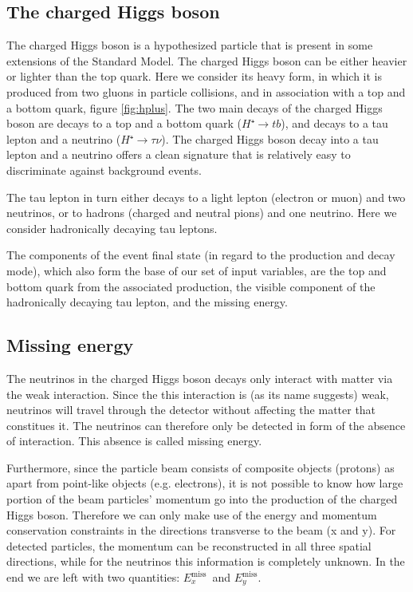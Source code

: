 \documentclass{scrartcl}
\newcommand{\exmiss}{$E_x^\text{miss}$}
\newcommand{\eymiss}{$E_y^\text{miss}$}
\begin{document}
\subsection{The charged Higgs boson}
The charged Higgs boson is a hypothesized particle that is present in some extensions of the Standard Model. The charged Higgs boson can be either heavier or lighter than the top quark. Here we consider its heavy form, in which it is produced from two gluons in particle collisions, and in association with a top and a bottom quark, figure \ref{fig:hplus}. The two main decays of the charged Higgs boson are decays to a top and a bottom quark ($H⁺→tb$), and decays to a tau lepton and a neutrino ($H⁺→τν$). The charged Higgs boson decay into a tau lepton and a neutrino offers a clean signature that is relatively easy to discriminate against background events.

The tau lepton in turn either decays to a light lepton (electron or muon) and two neutrinos, or to hadrons (charged and neutral pions) and one neutrino. Here we consider hadronically decaying tau leptons.

The components of the event final state (in regard to the production and decay mode), which also form the base of our set of input variables, are the top and bottom quark from the associated production, the visible component of the hadronically decaying tau lepton, and the missing energy.

\subsection{Missing energy}
The neutrinos in the charged Higgs boson decays only interact with matter via the weak interaction. Since the this interaction is (as its name suggests) weak, neutrinos will travel through the detector without affecting the matter that constitues it. The neutrinos can therefore only be detected in form of the absence of interaction. This absence is called missing energy.

Furthermore, since the particle beam consists of composite objects (protons) as apart from point-like objects (e.g. electrons), it is not possible to know how large portion of the beam particles' momentum go into the production of the charged Higgs boson. Therefore we can only make use of the energy and momentum conservation constraints in the directions transverse to the beam (x and y). For detected particles, the momentum can be reconstructed in all three spatial directions, while for the neutrinos this information is completely unknown. In the end we are left with two quantities: \exmiss\ and \eymiss.
\end{document}
